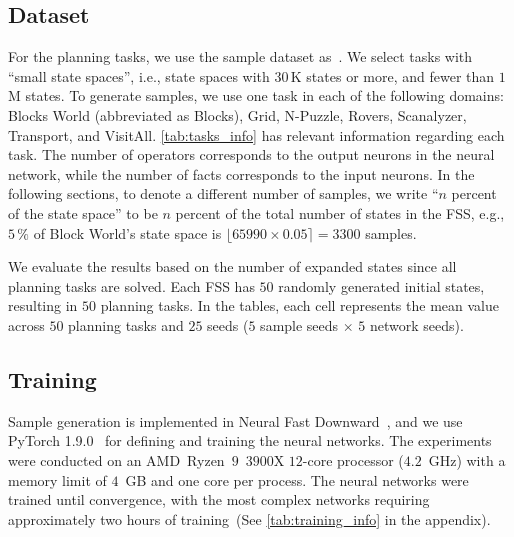 \documentclass[ppgc,diss,english]{iiufrgs}
\begin{document}
\subsection{Dataset}
\label{sec:exp-dataset}
For the planning tasks, we use the sample dataset as~\citet{Bettker.etal/2022}. We select tasks with ``small state spaces'', i.e., state spaces with $30$\,K states or more, and fewer than $1$\,M states. To generate samples, we use one task in each of the following domains: Blocks World (abbreviated as Blocks), Grid, N-Puzzle, Rovers, Scanalyzer, Transport, and VisitAll. \cref{tab:tasks_info} has relevant information regarding each task. The number of operators corresponds to the output neurons in the neural network, while the number of facts corresponds to the input neurons. In the following sections, to denote a different number of samples, we write ``$n$ percent of the state space'' to be $n$ percent of the total number of states in the FSS, e.g., $5\,\%$ of Block World's state space is $\lfloor 65990 \times 0.05 \rceil = 3300$ samples.

We evaluate the results based on the number of expanded states since all planning tasks are solved. Each FSS has $50$ randomly generated initial states, resulting in $50$ planning tasks. %
In the tables, each cell represents the mean value across $50$ planning tasks and $25$ seeds ($5$ sample seeds $\times$ $5$ network seeds).



\subsection{Training}
\label{sec:exp-training}
Sample generation is implemented in Neural Fast Downward~\cite{Ferber.etal/2020a}, and we use PyTorch 1.9.0~\cite{Paszke/2019} for defining and training the neural networks. The experiments were conducted on an AMD~Ryzen~$9$~$3900$X $12$-core processor ($4.2$~GHz) with a memory limit of $4$~GB and one core per process. The neural networks were trained until convergence, with the most complex networks requiring approximately two hours of training~(See \cref{tab:training_info} in the appendix).
\end{document}
